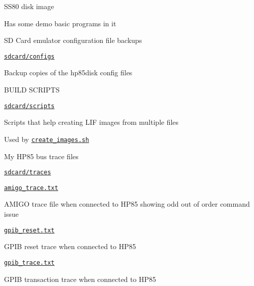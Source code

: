 \begin{DoxyItemize}
\begin{DoxyItemize}
\begin{DoxyItemize}
\begin{DoxyItemize}
\begin{DoxyItemize}
\item S\+S80 disk image
\item Has some demo basic programs in it
\end{DoxyItemize}
\end{DoxyItemize}
\item SD Card emulator configuration file backups
\begin{DoxyItemize}
\item \href{sdcard/configs}{\tt sdcard/configs}
\begin{DoxyItemize}
\item Backup copies of the hp85disk config files
\end{DoxyItemize}
\end{DoxyItemize}
\item B\+U\+I\+LD S\+C\+R\+I\+P\+TS
\begin{DoxyItemize}
\item \href{sdcard/scripts}{\tt sdcard/scripts}
\begin{DoxyItemize}
\item Scripts that help creating L\+IF images from multiple files
\item Used by \href{create_images.sh}{\tt create\+\_\+images.\+sh}
\end{DoxyItemize}
\end{DoxyItemize}
\item My H\+P85 bus trace files
\begin{DoxyItemize}
\item \href{sdcard/traces}{\tt sdcard/traces}
\item \href{sdcard/traces/amigo_trace.txt}{\tt amigo\+\_\+trace.\+txt}
\begin{DoxyItemize}
\item A\+M\+I\+GO trace file when connected to H\+P85 showing odd out of order command issue
\end{DoxyItemize}
\item \href{sdcard/traces/gpib_reset.txt}{\tt gpib\+\_\+reset.\+txt}
\begin{DoxyItemize}
\item G\+P\+IB reset trace when connected to H\+P85
\end{DoxyItemize}
\item \href{sdcard/traces/gpib_trace.txt}{\tt gpib\+\_\+trace.\+txt}
\begin{DoxyItemize}
\item G\+P\+IB transaction trace when connected to H\+P85
\end{DoxyItemize}

\end{DoxyItemize}
\end{DoxyItemize}
\end{DoxyItemize}
\end{DoxyItemize}
